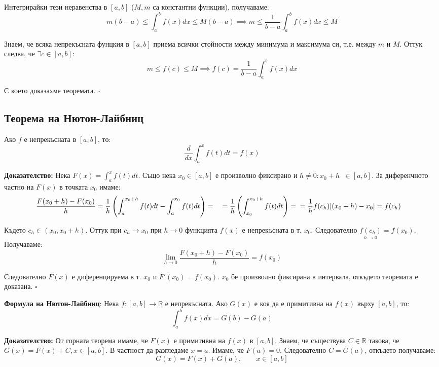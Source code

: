 \documentclass{article}
\renewcommand{\\}{\newline}
\newcommand{\doc}{\textbf{Доказателство: }}
\newcommand{\proven}{\hfill $\square$}
\begin{document}
Интегрирайки тези неравенства в \([a, b]\) (\(M, m\) са константни функции), получаваме:\[
  m(b-a) \leq \int_{a}^{b}f(x)dx \leq M(b-a) \implies m \leq \frac{1}{b-a}\int_{a}^{b}f(x)dx \leq M
\]   

Знаем, че всяка непрекъсната фунцкия в \([a,b]\)  приема всички стойности между минимума и максимума си, т.е. между \(m\) и \(M\). Оттук следва, че \(\exists c \in [a, b]\): \[
  m \leq f(c) \leq M \implies f(c) = \frac{1}{b-a}\int_{a}^{b}f(x)dx
\]   

С което доказахме теоремата. \proven

\subsection{Теорема на Нютон-Лайбниц} Ако \(f\) е непрекъсната в \([a, b]\), то: \[
  \frac{d}{dx}\int_{a}^{x}f(t)dt = f(x)
\]   

\doc Нека \(F(x) = \int_{a}^{x}f(t)dt\). Също нека \(x_{0} \in [a, b]\) е произволно фиксирано и \(h \not= 0: x_{0} + h\;\; \in [a, b]\). За диференчното частно на \(F(x)\) в точката \(x_{0}\) имаме: \begin{align*}
  \frac{F(x_{0} + h) - F(x_{0})}{h} &= \frac{1}{h}\left(\int_{a}^{x_{0} + h}f(t)dt - \int_{a}^{x_0}f(t)dt\right) = \\ 
                                    &= \frac{1}{h}\left(\int_{x_0}^{x_0 + h}f(t)dt\right) = \\ 
                                    &= \frac{1}{h}f(c_h)[(x_0 + h) - x_0] = f(c_{h})
\end{align*} 

Където \(c_{h} \in (x_0, x_{0} + h)\). Оттук при \(c_h \to x_0\) при \(h\to 0\) функцията \(f(x)\) е непрекъсната в т. \(x_0\). Следователно \(\underset{h\to0}{f(c_h)} = f(x_0)\). Получаваме: \[
  \underset{h\to0}{\lim}\frac{F(x_0 + h) - F(x_0)}{h} = f(x_0)
\]        

Следователно \(F(x)\) е диференцируема в т. \(x_0\) и \(F'(x_0) = f(x_0)\). \(x_0\) бе произволно фиксирана в интервала, откъдето теоремата е доказана. \proven   

\textbf{Формула на Нютон-Лайбниц}: Нека \(f: [a, b]\to \mathbb{R} \) е непрекъсната. Ако \(G(x) \) е коя да е примитивна на \(f(x)\) върху \([a, b]\), то: \[
  \int_{a}^{b}f(x)dx  = G(b) - G(a)
\]      

\doc От горната теорема имаме, че \(F(x)\) е примитивна на \(f(x)\) в \([a, b]\). Знаем, че съществува \(C \in \mathbb{R}\) такова, че \(G(x) = F(x) + C, x \in [a, b]\). В частност да разгледаме \(x = a\). Имаме, че \(F(a) = 0\). Следователно \(C = G(a)\), откъдето получаваме: \[
  G(x) = F(x) + G(a), \qquad x \in [a, b]
\]        
\end{document}
